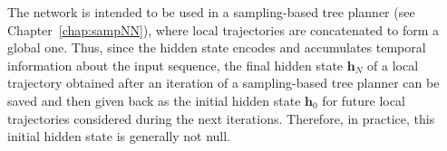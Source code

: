 The network is intended to be used in a sampling-based tree planner (see Chapter~\ref{chap:sampNN}), where local trajectories are concatenated to form a global one. 
Thus, since the hidden state encodes and accumulates temporal information about the input sequence, the final hidden state $\boldsymbol{h}_{N}$ of a local trajectory obtained after an iteration of a sampling-based tree planner can be saved and then given back as the initial hidden state $\boldsymbol{h}_{0}$ for future local trajectories considered during the next iterations. 
Therefore, in practice, this initial hidden state is generally not null.





